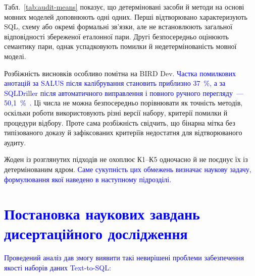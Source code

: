 \documentclass[a4paper,14pt,oneside]{extreport}
\begin{document}
Табл.~\ref{tab:audit-means} показує, що детерміновані засоби й методи на основі мовних моделей доповнюють одні одних. Перші відтворювано характеризують SQL, схему або окремі формальні зв'язки, але не встановлюють загальної відповідності збереженої еталонної пари. Другі безпосередньо оцінюють семантику пари, однак успадковують помилки й недетермінованість мовної моделі.

Розбіжність висновків особливо помітна на BIRD Dev. \textcolor{blue}{Частка помилкових анотацій за SALUS після калібрування становить приблизно 37~\%, а за SQLDriller після автоматичного виправлення і повного ручного перегляду~--- 50,1~\%~\cite{zhou2026salus,yang2025sqldriller}.} Ці числа не можна безпосередньо порівнювати як точність методів, оскільки роботи використовують різні версії набору, критерії помилки й процедури відбору. Проте сама розбіжність свідчить, що бінарна мітка без типізованого доказу й зафіксованих критеріїв недостатня для відтворюваного аудиту.

Жоден із розглянутих підходів не охоплює К1--К5 одночасно й не поєднує їх із детермінованим ядром. \textcolor{blue}{Саме сукупність цих обмежень визначає наукову задачу, формулювання якої наведено в наступному підрозділі.}

\section{\textcolor{blue}{Постановка наукових завдань дисертаційного дослідження}}
\label{sec:problem-statement}

\textcolor{blue}{Проведений аналіз дав змогу виявити такі невирішені проблеми забезпечення якості наборів даних Text-to-SQL:}
\end{document}
